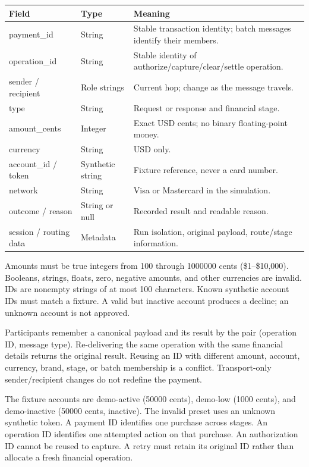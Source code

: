 \documentclass[10pt,letterpaper]{article}
\newcommand{\smalltitle}[1]{\par\vspace{5pt}{\color{navy}\large\bfseries #1}\par\vspace{2pt}}
\begin{document}
\begin{tabularx}{\linewidth}{>{\raggedright\arraybackslash}p{4.0cm}>{\raggedright\arraybackslash}p{3.0cm}Y}
\toprule
\textbf{Field} & \textbf{Type} & \textbf{Meaning} \\ \midrule
payment\_id & String & Stable transaction identity; batch messages identify their members. \\
operation\_id & String & Stable identity of authorize/capture/clear/settle operation. \\
sender / recipient & Role strings & Current hop; change as the message travels. \\
type & String & Request or response and financial stage. \\
amount\_cents & Integer & Exact USD cents; no binary floating-point money. \\
currency & String & USD only. \\
account\_id / token & Synthetic string & Fixture reference, never a card number. \\
network & String & Visa or Mastercard in the simulation. \\
outcome / reason & String or null & Recorded result and readable reason. \\
session / routing data & Metadata & Run isolation, original payload, route/stage information. \\
\bottomrule
\end{tabularx}

\smalltitle{Input policy}
Amounts must be true integers from 100 through 1000000 cents (\$1--\$10,000). Booleans, strings, floats, zero, negative amounts, and other currencies are invalid. IDs are nonempty strings of at most 100 characters. Known synthetic account IDs must match a fixture. A valid but inactive account produces a decline; an unknown account is not approved.

\smalltitle{Idempotency and conflict}
Participants remember a canonical payload and its result by the pair (operation ID, message type). Re-delivering the same operation with the same financial details returns the original result. Reusing an ID with different amount, account, currency, brand, stage, or batch membership is a conflict. Transport-only sender/recipient changes do not redefine the payment.

The fixture accounts are demo-active (50000 cents), demo-low (1000 cents), and demo-inactive (50000 cents, inactive). The invalid preset uses an unknown synthetic token. A payment ID identifies one purchase across stages. An operation ID identifies one attempted action on that purchase. An authorization ID cannot be reused to capture. A retry must retain its original ID rather than allocate a fresh financial operation.
\end{document}
